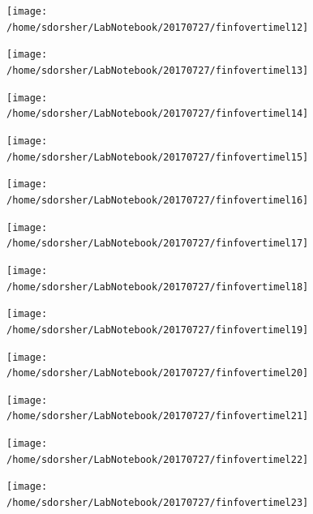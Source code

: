 \documentclass{article}
\begin{document}
\begin{figure}
  \texttt{[image: /home/sdorsher/LabNotebook/20170727/finfovertimel12]}
\end{figure}

\begin{figure}
  \texttt{[image: /home/sdorsher/LabNotebook/20170727/finfovertimel13]}
\end{figure}

\begin{figure}
  \texttt{[image: /home/sdorsher/LabNotebook/20170727/finfovertimel14]}
\end{figure}

\begin{figure}
  \texttt{[image: /home/sdorsher/LabNotebook/20170727/finfovertimel15]}
\end{figure}

\begin{figure}
  \texttt{[image: /home/sdorsher/LabNotebook/20170727/finfovertimel16]}
\end{figure}

\begin{figure}
  \texttt{[image: /home/sdorsher/LabNotebook/20170727/finfovertimel17]}
\end{figure}

\begin{figure}
  \texttt{[image: /home/sdorsher/LabNotebook/20170727/finfovertimel18]}
\end{figure}

\begin{figure}
  \texttt{[image: /home/sdorsher/LabNotebook/20170727/finfovertimel19]}
\end{figure}

\begin{figure}
  \texttt{[image: /home/sdorsher/LabNotebook/20170727/finfovertimel20]}
\end{figure}

\begin{figure}
  \texttt{[image: /home/sdorsher/LabNotebook/20170727/finfovertimel21]}
\end{figure}

\begin{figure}
  \texttt{[image: /home/sdorsher/LabNotebook/20170727/finfovertimel22]}
\end{figure}

\begin{figure}
  \texttt{[image: /home/sdorsher/LabNotebook/20170727/finfovertimel23]}
\end{figure}
\end{document}
